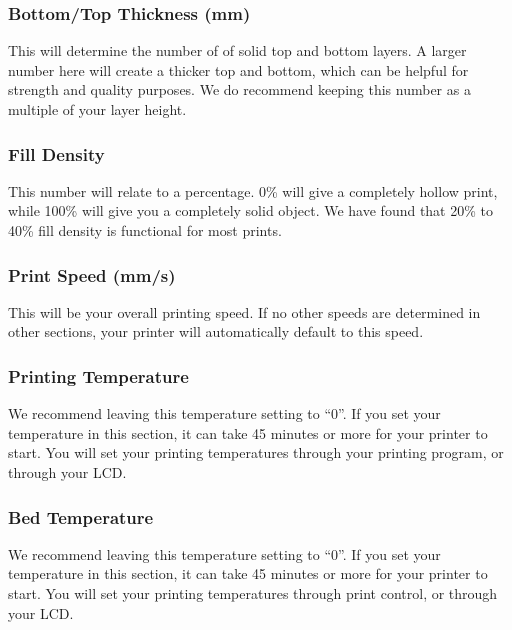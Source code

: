 \subsubsection{Bottom/Top Thickness (mm)}

This will determine the number of of solid top and bottom layers. A larger number here will create a thicker top and bottom, which can be helpful for strength and quality purposes. We do recommend keeping this number as a multiple of your layer height.

\subsubsection{Fill Density}

This number will relate to a percentage. 0\% will give a completely hollow print, while 100\% will give you a completely solid object. We have found that 20\% to 40\% fill density is functional for most prints.

\subsubsection{Print Speed (mm/s)}

This will be your overall printing speed. If no other speeds are determined in other sections, your printer will automatically default to this speed. 

\subsubsection{Printing Temperature}

We recommend leaving this temperature setting to “0”. If you set your temperature in this section, it can take 45 minutes or more for your printer to start. You will set your printing temperatures through your printing program, or through your LCD.

\subsubsection{Bed Temperature}

We recommend leaving this temperature setting to “0”. If you set your temperature in this section, it can take 45 minutes or more for your printer to start. You will set your printing temperatures through print control, or through your LCD.

